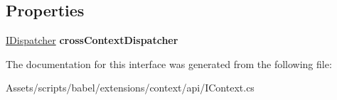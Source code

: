 \subsection*{Properties}
\begin{DoxyCompactItemize}
\item 
\hypertarget{interfacebabel_1_1extensions_1_1context_1_1api_1_1_i_context_a1e4e810b390bcf65445821a05050680a}{\hyperlink{interfacebabel_1_1extensions_1_1dispatcher_1_1api_1_1_i_dispatcher}{I\-Dispatcher} {\bfseries cross\-Context\-Dispatcher}}\label{interfacebabel_1_1extensions_1_1context_1_1api_1_1_i_context_a1e4e810b390bcf65445821a05050680a}

\end{DoxyCompactItemize}


The documentation for this interface was generated from the following file\-:\begin{DoxyCompactItemize}
\item 
Assets/scripts/babel/extensions/context/api/I\-Context.\-cs\end{DoxyCompactItemize}
